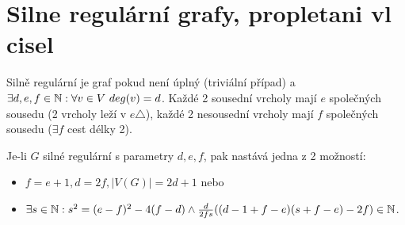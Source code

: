 \section{\texorpdfstring{Silne regulární grafy, propletani vl cisel}{Silne regulární grafy, propletani vl cisel}}
\vspace{5mm}
\large

\begin{definition}
	Silně regulární je graf pokud není úplný (triviální případ) a $\exists d,e,f \in \operatorname{\mathbb{N}}: \forall v \in V \ deg(v) = d$.
	Každé 2 sousední vrcholy mají $e$ společných sousedu (2 vrcholy leží v $e \triangle$), každé 2 nesousední vrcholy mají $f$ společných sousedu ($\exists f$ cest délky 2).
\end{definition}

\begin{theorem}
	Je-li $G$ silné regulární s parametry $d,e,f$, pak nastává jedna z 2 možností:
	\begin{itemize}
		\item $f = e + 1, d = 2f, |V(G)| = 2d + 1$ nebo
		\item $\exists s \in \operatorname{\mathbb{N}}: s^2 = (e - f)^2 - 4(f - d) \land \frac{d}{2fs}((d - 1 + f - e)(s + f - e) - 2f) \in \operatorname{\mathbb{N}}$.
	\end{itemize}
\end{theorem}
